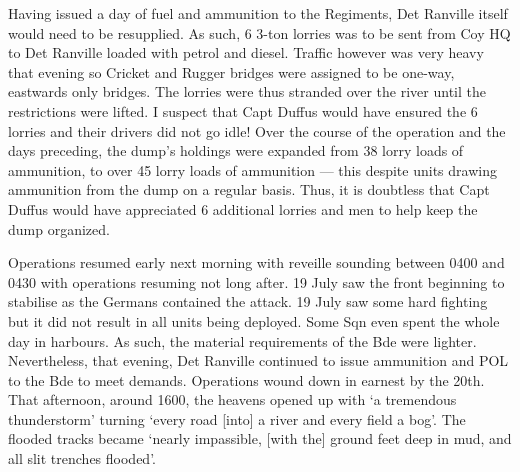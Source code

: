 \documentclass[noraggedright]{turabian-researchpaper}
\begin{document}
Having issued a day of fuel and ammunition to the Regiments, Det Ranville 
itself would need to be resupplied.  As such, 6 3-ton lorries was to be
sent from Coy HQ to Det Ranville loaded with petrol and diesel.  Traffic
however was very heavy that evening so Cricket and Rugger bridges were assigned
to be one-way, eastwards only bridges.\autocite[18 July 1944]{90wd}  The 
lorries were thus stranded over 
the river until the restrictions were lifted.  I suspect that Capt Duffus 
would have ensured the 6 lorries and their drivers did not go idle!  Over the
course of the operation and the days preceding, the dump's holdings were 
expanded from 38 lorry loads of ammunition, to over 45 lorry loads of 
ammunition --- this despite units drawing ammunition from the dump on a
regular basis.\autocite[25 July 1944]{90wd} Thus, it is doubtless that Capt 
Duffus would have appreciated 6 additional lorries and men to help keep the 
dump organized.


Operations resumed early next morning with reveille sounding between 0400 and 
0430 with operations resuming not long after.\autocites[19 July 1944]{staffswd}
[19 July 1944]{erywd}
19 July saw the front beginning to stabilise as the Germans contained the 
attack.  19 July saw some hard fighting but it did not result in all units 
being deployed.  Some Sqn even spent the whole day in harbours.\autocites
[19 July 1944]{staffswd}[19 July 1944]{1318wd}
As such, the material requirements of the Bde were lighter.  Nevertheless, 
that evening, Det Ranville continued to issue ammunition and POL to the Bde 
to meet demands.  Operations wound down in earnest by the 20th.  That 
afternoon, around 1600, the heavens opened up with `a tremendous thunderstorm'
turning `every road [into] a river and every field a bog'.\autocite
[20 July 1944]{27wd}  The flooded tracks became `nearly impassible, [with the]
ground feet deep in mud, and all slit trenches 
flooded'.\autocite[20 July 1944]{1318wd}
\end{document}
